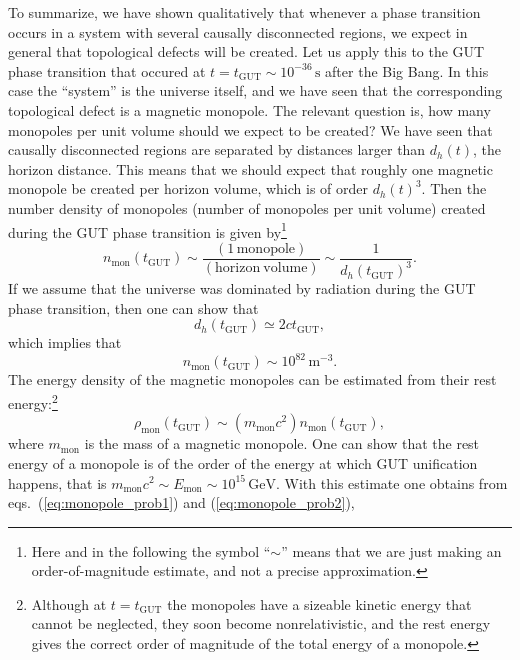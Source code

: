 \documentclass[11pt, a4paper,oneside,openright]{book}
\numberwithin{equation}{section}
\begin{document}
To summarize, we have shown qualitatively that whenever a phase transition occurs in a system with several causally disconnected regions, we expect in general that topological defects will be created. Let us apply this to the GUT phase transition that occured at $t=t_{\mathrm{GUT}}\sim 10^{-36}\,{\mathrm{s}}$ after the Big Bang. In this case the ``system'' is the universe itself, and we have seen that the corresponding topological defect is a magnetic monopole. The relevant question is, how many monopoles per unit volume should we expect to be created? We have seen that causally disconnected regions are separated by distances larger than $d_h(t)$, the horizon distance. This means that we should expect that roughly one magnetic monopole be created per horizon volume, which is of order $d_h(t)^3$. Then the number density of monopoles (number of monopoles per unit volume) created during the GUT phase transition is given by\footnote{Here and in the following the symbol ``$\sim$'' means that we are just making an 
order-of-magnitude estimate, and not a precise approximation.}
\begin{equation}
n_{\mathrm{mon}}(t_{\mathrm{GUT}})\sim \frac{(\mathrm{1\,monopole})}{(\mathrm{horizon~volume})}\sim \frac{1}{d_h(t_{\mathrm{GUT}})^3}.
\end{equation}
If we assume that the universe was dominated by radiation during the GUT phase transition, then one can show that
\begin{equation} \label{eq:horizon_dist_rad}
d_h(t_{\mathrm{GUT}})\simeq 2ct_{\mathrm{GUT}},
\end{equation}
which implies that
\begin{equation} \label{eq:monopole_prob1}
n_{\mathrm{mon}}(t_{\mathrm{GUT}})\sim 10^{82}\,\mathrm{m^{-3}}.
\end{equation}
The energy density of the magnetic monopoles can be estimated from their rest energy:\footnote{Although at $t=t_{\mathrm{GUT}}$ the monopoles have a sizeable kinetic energy that cannot be neglected, they soon become nonrelativistic, and the rest energy gives the correct order of magnitude of the total energy of a monopole.}
\begin{equation} \label{eq:monopole_prob2}
\rho_{\mathrm{mon}}(t_{\mathrm{GUT}})\sim (m_{\mathrm{mon}}c^2)n_{\mathrm{mon}}(t_{\mathrm{GUT}}),
\end{equation}
where $m_{\mathrm{mon}}$ is the mass of a magnetic monopole. One can show that the rest energy of a monopole is of the order of the energy at which GUT unification happens, that is $m_{\mathrm{mon}}c^2\sim E_{\mathrm{mon}}\sim10^{15}\,{\mathrm{GeV}}$. With this estimate one obtains from eqs.\ (\ref{eq:monopole_prob1}) and (\ref{eq:monopole_prob2}),
\end{document}
